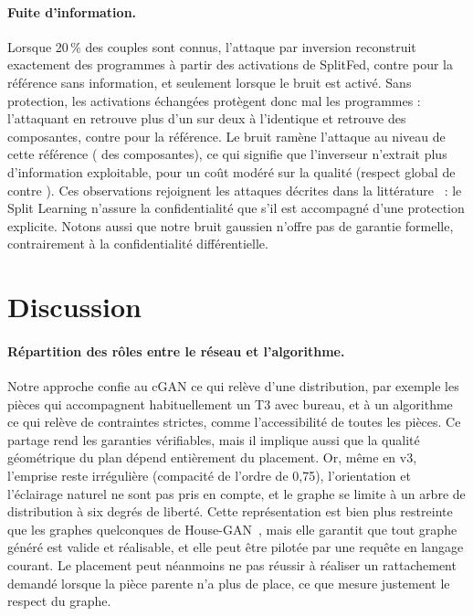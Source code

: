 \documentclass[twocolumn]{ICCKjournal}
\begin{document}
\paragraph{Fuite d'information.}
Lorsque 20\,\% des couples sont connus, l'attaque par inversion
reconstruit exactement \resLeakSplitfedExact{} des programmes à partir
des activations de SplitFed, contre \resLeakSplitfedBaselineExact{} pour
la référence sans information, et seulement \resLeakSplitfedBruitExact{}
lorsque le bruit est activé. Sans protection, les activations échangées
protègent donc mal les programmes : l'attaquant en retrouve plus d'un
sur deux à l'identique et retrouve \resLeakSplitfedParEntree{} des
composantes, contre \resLeakSplitfedBaselineParEntree{} pour la
référence. Le bruit ramène l'attaque au niveau de cette référence
(\resLeakSplitfedBruitParEntree{} des composantes), ce qui signifie que
l'inverseur n'extrait plus d'information exploitable, pour un coût
modéré sur la qualité (respect global de
\resSlSplitfedBruitGlobalRespectBrut{} contre
\resSlSplitfedGlobalRespectBrut{}). Ces observations rejoignent les
attaques décrites dans la littérature~\cite{Pasquini2022,Gao2023PCAT} :
le Split Learning n'assure la confidentialité que s'il est accompagné
d'une protection explicite. Notons aussi que notre bruit gaussien
n'offre pas de garantie formelle, contrairement à la confidentialité
différentielle.


\section{Discussion}

\paragraph{Répartition des rôles entre le réseau et l'algorithme.}
Notre approche confie au cGAN ce qui relève d'une distribution, par
exemple les pièces qui accompagnent habituellement un T3 avec bureau, et
à un algorithme ce qui relève de contraintes strictes, comme
l'accessibilité de toutes les pièces. Ce partage rend les garanties
vérifiables, mais il implique aussi que la qualité géométrique du plan
dépend entièrement du placement. Or, même en v3, l'emprise reste
irrégulière (compacité de l'ordre de 0,75), l'orientation et
l'éclairage naturel ne sont pas pris en compte, et le graphe se limite à
un arbre de distribution à six degrés de liberté. Cette représentation
est bien plus restreinte que les graphes quelconques de
House-GAN~\cite{Nauata2020HouseGAN}, mais elle garantit que tout graphe
généré est valide et réalisable, et elle peut être pilotée par une
requête en langage courant. Le placement peut néanmoins ne pas réussir
à réaliser un rattachement demandé lorsque la pièce parente n'a plus de
place, ce que mesure justement le respect du graphe.
\end{document}
